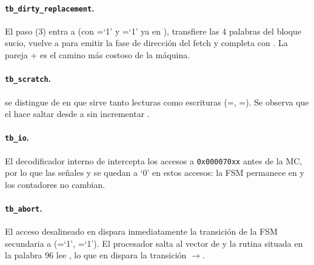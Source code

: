 \paragraph{\texttt{tb\_dirty\_replacement}.} El paso (3) entra a
 (con =`1' y =`1' ya en
), transfiere las 4 palabras del bloque sucio, vuelve a 
para emitir la fase de direcci\'on del fetch y completa con . La
pareja + es el camino m\'as costoso de la m\'aquina.

\paragraph{\texttt{tb\_scratch}.}  se distingue de 
en que sirve tanto lecturas como escrituras (=,
=). Se observa que el  hace
saltar desde  a  sin incrementar .

\paragraph{\texttt{tb\_io}.} El decodificador interno de 
intercepta los accesos a \texttt{0x000070xx} antes de la MC, por lo que las
se\~nales  y  se quedan a `0' en estos accesos: la FSM
permanece en  y los contadores no cambian.

\paragraph{\texttt{tb\_abort}.} El acceso desalineado en  dispara
inmediatamente la transici\'on de la FSM secundaria a 
(=`1', =`1'). El procesador salta al
vector de  y la rutina situada en la palabra 96 lee
, lo que en  dispara la transici\'on
$\to$.

